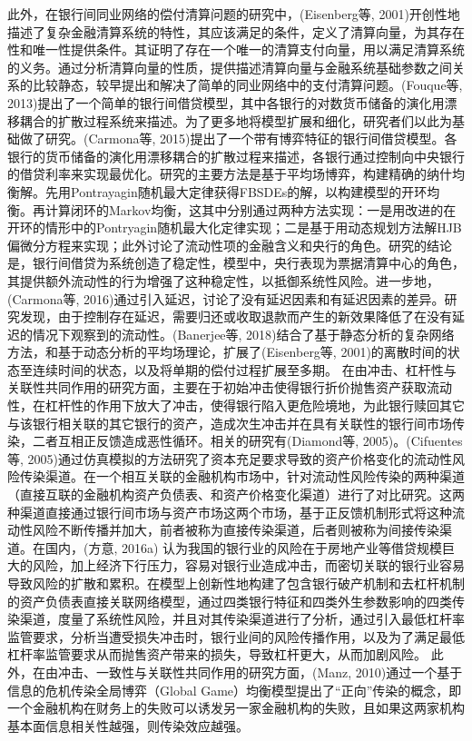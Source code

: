 此外，在银行间同业网络的偿付清算问题的研究中，(Eisenberg等, 2001)开创性地描述了复杂金融清算系统的特性，其应该满足的条件，定义了清算向量，为其存在性和唯一性提供条件。其证明了存在一个唯一的清算支付向量，用以满足清算系统的义务。通过分析清算向量的性质，提供描述清算向量与金融系统基础参数之间关系的比较静态，较早提出和解决了简单的同业网络中的支付清算问题。(Fouque等, 2013)提出了一个简单的银行间借贷模型，其中各银行的对数货币储备的演化用漂移耦合的扩散过程系统来描述。为了更多地将模型扩展和细化，研究者们以此为基础做了研究。(Carmona等, 2015)提出了一个带有博弈特征的银行间借贷模型。各银行的货币储备的演化用漂移耦合的扩散过程来描述，各银行通过控制向中央银行的借贷利率来实现最优化。研究的主要方法是基于平均场博弈，构建精确的纳什均衡解。先用Pontrayagin随机最大定律获得FBSDEs的解，以构建模型的开环均衡。再计算闭环的Markov均衡，这其中分别通过两种方法实现：一是用改进的在开环的情形中的Pontryagin随机最大化定律实现；二是基于用动态规划方法解HJB偏微分方程来实现；此外讨论了流动性项的金融含义和央行的角色。研究的结论是，银行间借贷为系统创造了稳定性，模型中，央行表现为票据清算中心的角色，其提供额外流动性的行为增强了这种稳定性，以抵御系统性风险。进一步地，(Carmona等, 2016)通过引入延迟，讨论了没有延迟因素和有延迟因素的差异。研究发现，由于控制存在延迟，需要归还或收取退款而产生的新效果降低了在没有延迟的情况下观察到的流动性。(Banerjee等, 2018)结合了基于静态分析的复杂网络方法，和基于动态分析的平均场理论，扩展了(Eisenberg等, 2001)的离散时间的状态至连续时间的状态，以及将单期的偿付过程扩展至多期。
在由冲击、杠杆性与关联性共同作用的研究方面，主要在于初始冲击使得银行折价抛售资产获取流动性，在杠杆性的作用下放大了冲击，使得银行陷入更危险境地，为此银行赎回其它与该银行相关联的其它银行的资产，造成次生冲击并在具有关联性的银行间市场传染，二者互相正反馈造成恶性循环。相关的研究有(Diamond等, 2005)。(Cifuentes等, 2005)通过仿真模拟的方法研究了资本充足要求导致的资产价格变化的流动性风险传染渠道。在一个相互关联的金融机构市场中，针对流动性风险传染的两种渠道（直接互联的金融机构资产负债表、和资产价格变化渠道）进行了对比研究。这两种渠道直接通过银行间市场与资产市场这两个市场，基于正反馈机制形式将这种流动性风险不断传播并加大，前者被称为直接传染渠道，后者则被称为间接传染渠道。在国内，(方意, 2016a) 认为我国的银行业的风险在于房地产业等借贷规模巨大的风险，加上经济下行压力，容易对银行业造成冲击，而密切关联的银行业容易导致风险的扩散和累积。在模型上创新性地构建了包含银行破产机制和去杠杆机制的资产负债表直接关联网络模型，通过四类银行特征和四类外生参数影响的四类传染渠道，度量了系统性风险，并且对其传染渠道进行了分析，通过引入最低杠杆率监管要求，分析当遭受损失冲击时，银行业间的风险传播作用，以及为了满足最低杠杆率监管要求从而抛售资产带来的损失，导致杠杆更大，从而加剧风险。
此外，在由冲击、一致性与关联性共同作用的研究方面，(Manz, 2010)通过一个基于信息的危机传染全局博弈（Global Game）均衡模型提出了“正向”传染的概念，即一个金融机构在财务上的失败可以诱发另一家金融机构的失败，且如果这两家机构基本面信息相关性越强，则传染效应越强。


